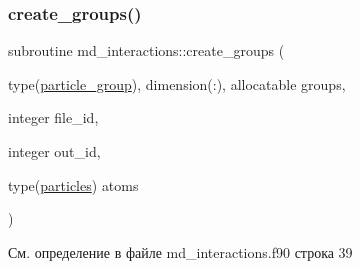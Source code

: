 \subsubsection{\texorpdfstring{create\+\_\+groups()}{create\_groups()}}
{\footnotesize\ttfamily subroutine md\+\_\+interactions\+::create\+\_\+groups (\begin{DoxyParamCaption}\item[{type(\mbox{\hyperlink{structmd__general_1_1particle__group}{particle\+\_\+group}}), dimension(\+:), allocatable}]{groups,  }\item[{integer}]{file\+\_\+id,  }\item[{integer}]{out\+\_\+id,  }\item[{type(\mbox{\hyperlink{structmd__general_1_1particles}{particles}})}]{atoms }\end{DoxyParamCaption})}



См. определение в файле md\+\_\+interactions.\+f90 строка 39


